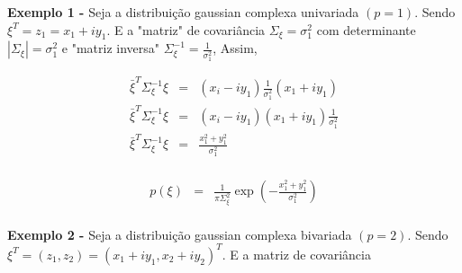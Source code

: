 \documentclass[10pt,a4paper]{article}
\begin{document}
{\bf Exemplo 1 -} Seja a distribuição gaussian complexa univariada $(p=1)$. Sendo $\xi^{T}=z_1=x_1+iy_1$. E a "matriz" de covariância $\Sigma_{\xi}=\sigma_{1}^{2}$ com determinante $|\Sigma_{\xi}|=\sigma_{1}^{2}$ e  "matriz inversa" $\Sigma_{\xi}^{-1}=\frac{1}{\sigma_{1}^{2}}$, Assim,

\begin{equation}\label{sec2eqn2}
\begin{array}{ccc}
	\bar{\xi}^{T}\Sigma_{\xi}^{-1}\xi&=&(x_i-iy_1)\frac{1}{\sigma_1^2}(x_1+iy_1)  \\
	\bar{\xi}^{T}\Sigma_{\xi}^{-1}\xi&=&(x_i-iy_1)(x_1+iy_1)\frac{1}{\sigma_1^2}  \\
	\bar{\xi}^{T}\Sigma_{\xi}^{-1}\xi&=&\frac{x_1^2+y_1^2}{\sigma_1^2}  \\
\end{array}
\end{equation}


\begin{equation}\label{sec2eqn3}
\begin{array}{ccc}
	p(\xi)&=&\frac{1}{\pi\Sigma_{\xi}^{2}}\exp\left(-\frac{x_1^2+y_1^2}{\sigma_1^2}\right)  \\
\end{array}
\end{equation}

{\bf Exemplo 2 -} Seja a distribuição gaussian complexa bivariada $(p=2)$. Sendo $\xi^{T}=(z_1, z_2)=(x_1 + iy_1, x_2 + iy_2)^{T}$. E a matriz de covariância 
\end{document}
